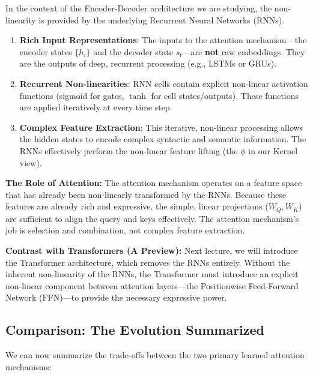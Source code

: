 \documentclass{article}
\begin{document}
\begin{tcolorbox}[colback=blue!5!white, colframe=blue!75!black, title=Non-linearity in the RNN Seq2Seq Architecture]
In the context of the Encoder-Decoder architecture we are studying, the non-linearity is provided by the underlying Recurrent Neural Networks (RNNs).

\begin{enumerate}
\item \textbf{Rich Input Representations}: The inputs to the attention mechanism---the encoder states $\{h_i\}$ and the decoder state $s_t$---are \textbf{not} raw embeddings. They are the outputs of deep, recurrent processing (e.g., LSTMs or GRUs).
\item \textbf{Recurrent Non-linearities}: RNN cells contain explicit non-linear activation functions (sigmoid for gates, $\tanh$ for cell states/outputs). These functions are applied iteratively at every time step.
\item \textbf{Complex Feature Extraction}: This iterative, non-linear processing allows the hidden states to encode complex syntactic and semantic information. The RNNs effectively perform the non-linear feature lifting (the $\phi$ in our Kernel view).
\end{enumerate}

\textbf{The Role of Attention:}
The attention mechanism operates on a feature space that has already been non-linearly transformed by the RNNs. Because these features are already rich and expressive, the simple, linear projections ($W_Q, W_K$) are sufficient to align the query and keys effectively. The attention mechanism's job is selection and combination, not complex feature extraction.

\textbf{Contrast with Transformers (A Preview):}
Next lecture, we will introduce the Transformer architecture, which removes the RNNs entirely. Without the inherent non-linearity of the RNNs, the Transformer must introduce an explicit non-linear component between attention layers---the Positionwise Feed-Forward Network (FFN)---to provide the necessary expressive power.
\end{tcolorbox}

\subsection{Comparison: The Evolution Summarized}

We can now summarize the trade-offs between the two primary learned attention mechanisms:
\end{document}
